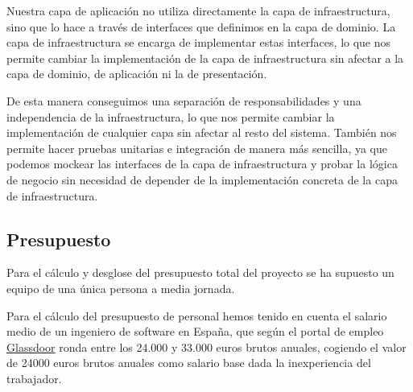 Nuestra capa de aplicación no utiliza directamente la capa de infraestructura, sino que lo hace a través de interfaces que definimos en la capa de dominio. La capa de infraestructura se encarga de implementar estas interfaces, lo que nos permite cambiar la implementación de la capa de infraestructura sin afectar a la capa de dominio, de aplicación ni la de presentación.

De esta manera conseguimos una separación de responsabilidades y una independencia de la infraestructura, lo que nos permite cambiar la implementación de cualquier capa sin afectar al resto del sistema.
También nos permite hacer pruebas unitarias e integración de manera más sencilla, ya que podemos \gls{mockear} las interfaces de la capa de infraestructura y probar la lógica de negocio sin necesidad de depender de la implementación concreta de la capa de infraestructura.

\subsection{Presupuesto}
Para el cálculo y desglose del presupuesto total del proyecto se ha supuesto un equipo de una única persona a media jornada.

Para el cálculo del presupuesto de personal hemos tenido en cuenta el salario medio de un ingeniero de software en España, que según el portal de empleo \href{https://www.glassdoor.es/Sueldos/granada-software-engineer-sueldo-SRCH_IL.0,7_IC2614045_KO8,25.htm}{Glassdoor} ronda entre los 24.000 y 33.000 euros brutos anuales, cogiendo el valor de 24000 euros brutos anuales como salario base dada la inexperiencia del trabajador.

